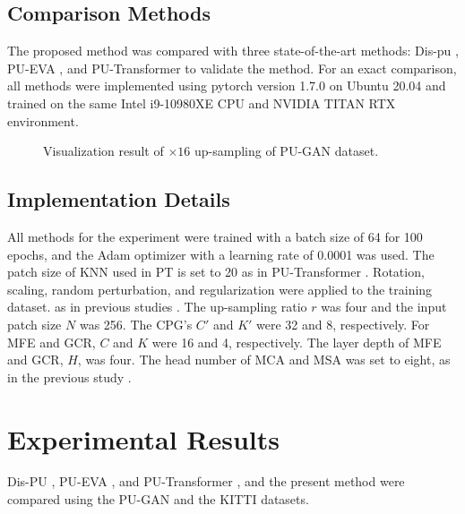\documentclass{article}
\begin{document}
\subsection{Comparison Methods}
\quad The proposed method was compared with three state-of-the-art methods: Dis-pu \cite{li2021point}, PU-EVA \cite{luo2021pu}, and PU-Transformer \cite{qiu2021pu} to validate the method. For an exact comparison, all methods were implemented using pytorch \cite{NEURIPS2019_9015} version 1.7.0 on Ubuntu 20.04 and trained on the same Intel i9-10980XE CPU and NVIDIA TITAN RTX environment.

\begin{figure}[htb!]
  \centering
  \caption{Visualization result of $\times16$ up-sampling of PU-GAN dataset.}
    \label{fig:x16}
\end{figure}

\subsection{Implementation Details}
\label{sec:implementation}
\quad All methods for the experiment were trained with a batch size of 64 for 100 epochs, and the Adam \cite{kingma2014adam}  optimizer with a learning rate of 0.0001 was used. The patch size of KNN used in PT is set to 20 as in PU-Transformer \cite{qiu2021pu}. Rotation, scaling, random perturbation, and regularization were applied to the training dataset. as in previous studies \cite{yu2018pu,li2019pu}. The up-sampling ratio $r$ was four and the input patch size $N$ was 256. The CPG's $C'$ and $K'$ were 32 and 8, respectively. For MFE and GCR, $C$ and $K$ were 16 and 4, respectively. The layer depth of MFE and GCR, $H$, was four. The head number of MCA and MSA was set to eight, as in the previous study \cite{vaswani2017attention}.

\section{Experimental Results}
\label{sec:experiment_results}
\quad Dis-PU \cite{li2021point}, PU-EVA \cite{luo2021pu}, and PU-Transformer \cite{qiu2021pu}, and the present method were compared using the PU-GAN \cite{li2019pu} and the KITTI \cite{geiger2013vision} datasets.
\end{document}
